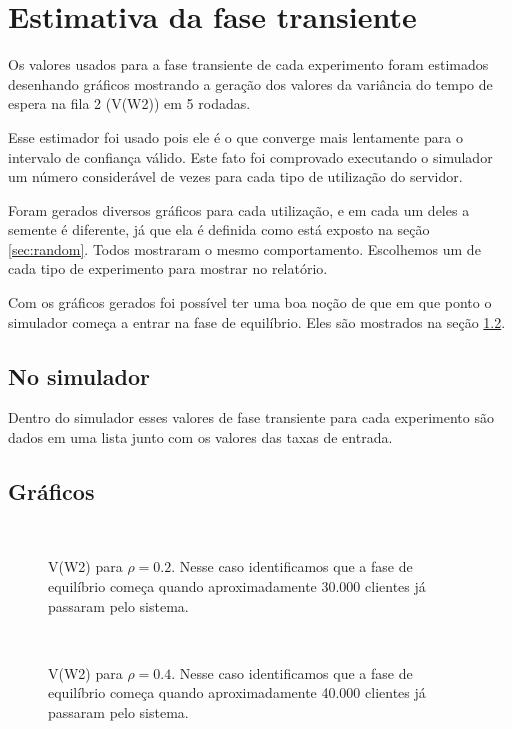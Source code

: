 \chapter{Estimativa da fase transiente}
\label{chap:estimativa}

Os valores usados para a fase transiente de cada experimento foram estimados desenhando gráficos mostrando a geração dos valores da variância do tempo de espera na fila 2 (V(W2)) em 5 rodadas.

Esse estimador foi usado pois ele é o que converge mais lentamente para o intervalo de confiança válido. Este fato foi comprovado executando o simulador um número considerável de vezes para cada tipo de utilização do servidor.

Foram gerados diversos gráficos para cada utilização, e em cada um deles a semente é diferente, já que ela é definida como está exposto na seção \ref{sec:random}. Todos mostraram o mesmo comportamento. Escolhemos um de cada tipo de experimento para mostrar no relatório.

Com os gráficos gerados foi possível ter uma boa noção de que em que ponto o simulador começa a entrar na fase de equilíbrio. Eles são mostrados na seção \ref{sec:graficos}.

\section{No simulador}

Dentro do simulador esses valores de fase transiente para cada experimento são dados em uma lista junto com os valores das taxas de entrada.

\section{Gráficos}
\label{sec:graficos}

\begin{figure}[htb!]
   \\
   \caption{V(W2) para $\rho=0.2$. Nesse caso identificamos que a fase de equilíbrio começa quando aproximadamente 30.000 clientes já passaram pelo sistema.}
\end{figure}

\begin{figure}[htb!]
   \\
   \caption{V(W2) para $\rho=0.4$. Nesse caso identificamos que a fase de equilíbrio começa quando aproximadamente 40.000 clientes já passaram pelo sistema.}
\end{figure}


